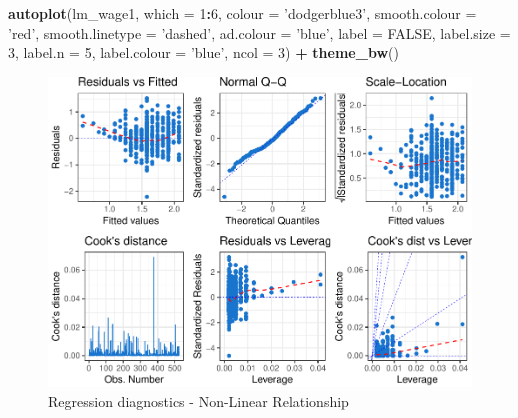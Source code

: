 \documentclass[]{book}
\newenvironment{Shaded}{\begin{snugshade}}{\end{snugshade}}
\newcommand{\DataTypeTok}[1]{\textcolor[rgb]{0.13,0.29,0.53}{#1}}
\newcommand{\DecValTok}[1]{\textcolor[rgb]{0.00,0.00,0.81}{#1}}
\newcommand{\KeywordTok}[1]{\textcolor[rgb]{0.13,0.29,0.53}{\textbf{#1}}}
\newcommand{\NormalTok}[1]{#1}
\newcommand{\OperatorTok}[1]{\textcolor[rgb]{0.81,0.36,0.00}{\textbf{#1}}}
\newcommand{\OtherTok}[1]{\textcolor[rgb]{0.56,0.35,0.01}{#1}}
\newcommand{\StringTok}[1]{\textcolor[rgb]{0.31,0.60,0.02}{#1}}
\begin{document}
\begin{Shaded}
\begin{Highlighting}[]
\KeywordTok{autoplot}\NormalTok{(lm_wage1, }\DataTypeTok{which =} \DecValTok{1}\OperatorTok{:}\DecValTok{6}\NormalTok{, }\DataTypeTok{colour =} \StringTok{'dodgerblue3'}\NormalTok{,}
         \DataTypeTok{smooth.colour =} \StringTok{'red'}\NormalTok{, }\DataTypeTok{smooth.linetype =} \StringTok{'dashed'}\NormalTok{,}
         \DataTypeTok{ad.colour =} \StringTok{'blue'}\NormalTok{,}
         \DataTypeTok{label =} \OtherTok{FALSE}\NormalTok{,}
         \DataTypeTok{label.size =} \DecValTok{3}\NormalTok{, }\DataTypeTok{label.n =} \DecValTok{5}\NormalTok{, }\DataTypeTok{label.colour =} \StringTok{'blue'}\NormalTok{,}
         \DataTypeTok{ncol =} \DecValTok{3}\NormalTok{) }\OperatorTok{+}
\StringTok{  }\KeywordTok{theme_bw}\NormalTok{()}
\end{Highlighting}
\end{Shaded}

\begin{figure}

{\centering \includegraphics[width=0.8\linewidth]{MEM5220_R_files/figure-latex/fig14-1} 

}

\caption{Regression diagnostics - Non-Linear Relationship}\label{fig:fig14}
\end{figure}
\end{document}

